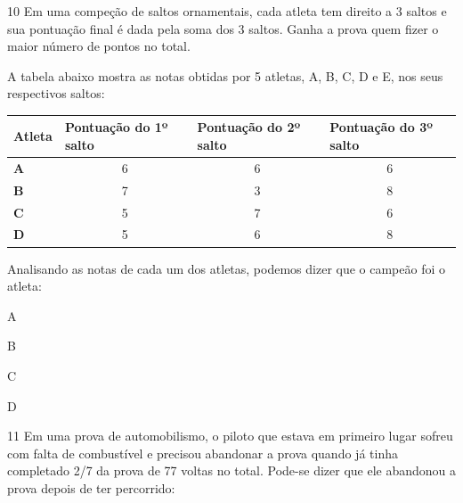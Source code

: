 \num{10} Em uma compeção de saltos ornamentais, cada atleta tem direito
a 3 saltos e sua pontuação final é dada pela soma dos 3 saltos. Ganha a
prova quem fizer o maior número de pontos no total.

A tabela abaixo mostra as notas obtidas por 5 atletas, A, B, C, D e E,
nos seus respectivos saltos:

\begin{tabular}{l|c|c|c}
\hline
\textbf{Atleta} & \multicolumn{1}{l|}{\textbf{Pontuação do 1º salto}} & \multicolumn{1}{l|}{\textbf{Pontuação do 2º salto}} & \multicolumn{1}{l}{\textbf{Pontuação do 3º salto}} \\ \hline
\textbf{A} & 6 & 6 & 6 \\ \hline
\textbf{B} & 7 & 3 & 8 \\ \hline
\textbf{C} & 5 & 7 & 6 \\ \hline
\textbf{D} & 5 & 6 & 8 \\ \hline
\end{tabular}

Analisando as notas de cada um dos atletas, podemos dizer que o campeão
foi o atleta:

\begin{minipage}{.5\textwidth}
\begin{escolha}
\item
  A
\item
  B
\item
  C
\item
  D
\end{escolha}
\end{minipage}

\num{11} Em uma prova de automobilismo, o piloto que estava em
primeiro lugar sofreu com falta de combustível e precisou abandonar a
prova quando já tinha completado 2/7 da prova de 77 voltas no total.
Pode-se dizer que ele abandonou a prova depois de ter percorrido:

